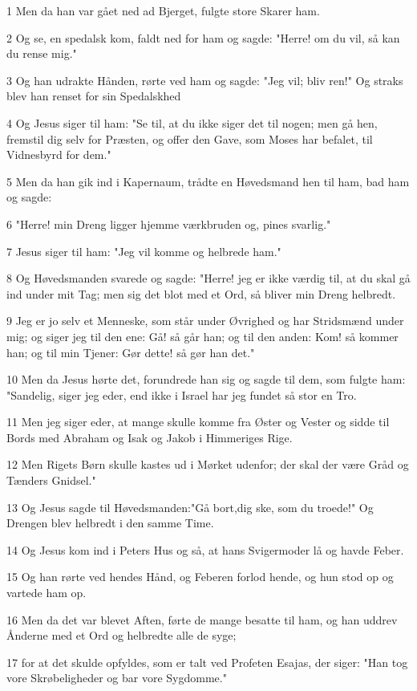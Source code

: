 \par 1 Men da han var gået ned ad Bjerget, fulgte store Skarer ham.
\par 2 Og se, en spedalsk kom, faldt ned for ham og sagde: "Herre! om du vil, så kan du rense mig."
\par 3 Og han udrakte Hånden, rørte ved ham og sagde: "Jeg vil; bliv ren!" Og straks blev han renset for sin Spedalskhed
\par 4 Og Jesus siger til ham: "Se til, at du ikke siger det til nogen; men gå hen, fremstil dig selv for Præsten, og offer den Gave, som Moses har befalet, til Vidnesbyrd for dem."
\par 5 Men da han gik ind i Kapernaum, trådte en Høvedsmand hen til ham, bad ham og sagde:
\par 6 "Herre! min Dreng ligger hjemme værkbruden og, pines svarlig."
\par 7 Jesus siger til ham: "Jeg vil komme og helbrede ham."
\par 8 Og Høvedsmanden svarede og sagde: "Herre! jeg er ikke værdig til, at du skal gå ind under mit Tag; men sig det blot med et Ord, så bliver min Dreng helbredt.
\par 9 Jeg er jo selv et Menneske, som står under Øvrighed og har Stridsmænd under mig; og siger jeg til den ene: Gå! så går han; og til den anden: Kom! så kommer han; og til min Tjener: Gør dette! så gør han det."
\par 10 Men da Jesus hørte det, forundrede han sig og sagde til dem, som fulgte ham: "Sandelig, siger jeg eder, end ikke i Israel har jeg fundet så stor en Tro.
\par 11 Men jeg siger eder, at mange skulle komme fra Øster og Vester og sidde til Bords med Abraham og Isak og Jakob i Himmeriges Rige.
\par 12 Men Rigets Børn skulle kastes ud i Mørket udenfor; der skal der være Gråd og Tænders Gnidsel."
\par 13 Og Jesus sagde til Høvedsmanden:"Gå bort,dig ske, som du troede!" Og Drengen blev helbredt i den samme Time.
\par 14 Og Jesus kom ind i Peters Hus og så, at hans Svigermoder lå og havde Feber.
\par 15 Og han rørte ved hendes Hånd, og Feberen forlod hende, og hun stod op og vartede ham op.
\par 16 Men da det var blevet Aften, førte de mange besatte til ham, og han uddrev Ånderne med et Ord og helbredte alle de syge;
\par 17 for at det skulde opfyldes, som er talt ved Profeten Esajas, der siger: "Han tog vore Skrøbeligheder og bar vore Sygdomme."
